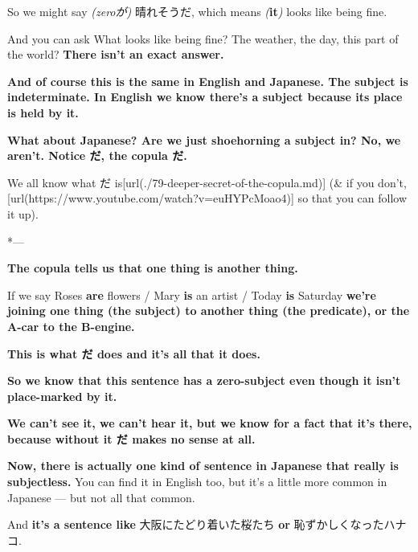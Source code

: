 So we might say {\em (zeroが)} 晴れそうだ, which means {\em (}{\bf it}{\em )} looks like being fine.

{}

And you can ask What looks like being fine? The weather, the day, this part of the world? {\bf There isn't an exact answer.}

{\bf And of course this is the same in English and Japanese. The subject is indeterminate. In English we know there's a subject because its place is held by it.}

{\bf What about Japanese? Are we just shoehorning a subject in? No, we aren't. Notice だ, the copula だ.}

{}

We all know what だ is\goto{{[}79{]}}[url(./79-deeper-secret-of-the-copula.md)] (& if you don't, [url(https://www.youtube.com/watch?v=euHYPcMoao4)] so that you can follow it up).

*---

{\bf The copula tells us that one thing is another thing.}

{}

If we say Roses {\bf are} flowers / Mary {\bf is} an artist / Today {\bf is} Saturday {\bf we're joining one thing (the subject) to another thing (the predicate),\crlf
or the A-car to the B-engine.}

{\bf This is what だ does and it's all that it does.}

{\bf So we know that this sentence has a zero-subject even though it isn't place-marked by it.}

{}

{\bf We can't see it, we can't hear it, but we know for a fact that it's there, because without it だ makes no sense at all.}

\stopsectionlevel

\startsectionlevel[title={Really Subjectless sentences in Japanese},reference={really-subjectless-sentences-in-japanese}]

{\bf Now, there is actually one kind of sentence in Japanese that really is subjectless.} You can find it in English too, but it's a little more common in Japanese --- but not all that common.

And {\bf it's a sentence like} 大阪にたどり着いた桜たち {\bf or} 恥ずかしくなったハナコ.

